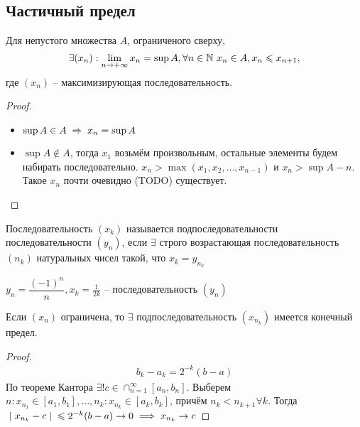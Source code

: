 \subsection{Частичный предел}
\begin{theorem}
    Для непустого множества $A$, ограниченого сверху, 
        \[ \exists (x_n) : \lim_{n\to+\infty} x_n = \sup{A}, \forall n \in \mathbb{N}\ x_n \in A, x_n \leqslant x_{n + 1}, \]
    где $(x_n)$ -- максимизирующая последовательность.
\end{theorem}
\begin{proof}\phantom\\
    \begin{itemize}
        \item $\sup{A} \in A \thus x_n = \sup{A}$
        \item $\sup{A} \notin A$, тогда $x_1$ возьмём произвольным, остальные элементы будем набирать последовательно. $x_n > \max(x_1, x_2, \ldots, x_{n - 1})$ и $x_n > \sup{A} - n$. Такое $x_n$ почти очевидно (TODO) существует.
    \end{itemize}
\end{proof}

\begin{definition}
    Последовательность $ (x_k) $ называется подпоследовательности последовательности $ (y_n) $,
    если $ \exists  $ строго возрастающая последовательность $ (n_k) $ натуральных чисел такой, что $ x_k = y_{n_k} $
\end{definition}
\begin{example}
    $ y_n = \dfrac{( - 1)^ n}{n}, x_k = \frac{1}{2k} $ -- последовательность $ (y_n) $
\end{example}

\begin{theorem}
    \label{Existslimits-sequencesubseq}
    Если $ (x_n) $ ограничена, то $ \exists  $ подпоследовательность $ (x_{n_k}) $ имеется конечный предел.
\end{theorem}
\begin{proof}
    \begin{gather}
        b_k - a_k = 2^{ - k}(b - a)
    \end{gather}
    По теореме Кантора $ \exists ! c \in \cap_{n = 1}^\infty [a_n, b_n] $. Выберем $ n: x_{n_1}  \in [a_1, b_1], \dots , n_k : x_{n_k} \in [a_k, b_k]$, причём $ n_k < n_{k + 1} \forall k $.
    Тогда $ \;\vert\; x_{n_k} - c \;\vert\; \leqslant  2^{ - k}(b - a) \to  0 \implies  x_{n_k} \to c $
\end{proof}

